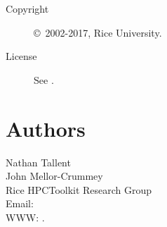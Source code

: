 \documentclass[english]{article}
\begin{document}
\begin{description}
\item[Copyright] \copyright\ 2002-2017, Rice University.
\item[License] See .
\end{description}

\section{Authors}

\noindent
Nathan Tallent \\
John Mellor-Crummey \\
Rice HPCToolkit Research Group \\
Email:  \\
WWW: .

\LatexManEnd
\end{document}
